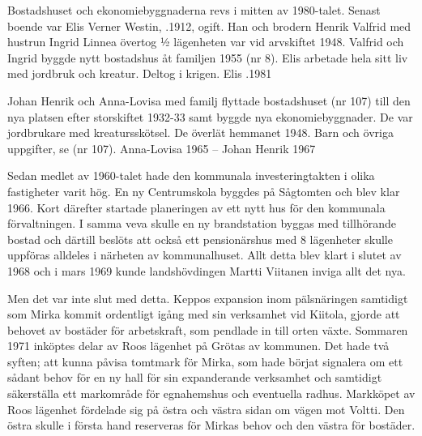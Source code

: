 
Bostadshuset och ekonomiebyggnaderna revs i mitten av 1980-talet. Senast boende var Elis Verner Westin, .1912, ogift. Han och brodern Henrik Valfrid med hustrun Ingrid Linnea övertog ½ lägenheten var vid arvskiftet 1948. Valfrid och Ingrid byggde nytt bostadshus åt familjen 1955 (nr 8). Elis arbetade hela sitt liv med jordbruk och kreatur.  Deltog i krigen. Elis .1981

Johan Henrik och Anna-Lovisa med familj flyttade  bostadshuset (nr 107) till den nya platsen efter storskiftet 1932-33 samt byggde nya ekonomiebyggnader. De var jordbrukare med kreatursskötsel. De överlät hemmanet 1948.
Barn och övriga uppgifter, se (nr 107).
Anna-Lovisa  1965  --  Johan Henrik  1967





Sedan medlet av 1960-talet hade den kommunala investeringtakten i olika fastigheter varit hög. En ny Centrumskola byggdes på Sågtomten och blev klar 1966. Kort därefter startade planeringen av ett nytt hus för den kommunala förvaltningen. I samma veva skulle en ny brandstation byggas med tillhörande bostad och därtill beslöts att också ett pensionärshus med 8 lägenheter skulle uppföras alldeles i närheten av kommunalhuset. Allt detta blev klart i slutet av 1968 och i mars 1969 kunde landshövdingen Martti Viitanen inviga allt det nya.

Men det var inte slut med detta. Keppos expansion inom pälsnäringen samtidigt som Mirka kommit ordentligt igång med sin verksamhet vid Kiitola, gjorde att behovet av bostäder för arbetskraft, som pendlade in till orten växte. Sommaren 1971 inköptes delar av Roos lägenhet på Grötas av kommunen. Det hade två syften; att kunna påvisa tomtmark för Mirka, som hade börjat signalera om ett sådant behov för en ny hall för sin expanderande verksamhet och samtidigt säkerställa ett markområde för egnahemshus och eventuella radhus. Markköpet av Roos lägenhet fördelade sig på östra och västra sidan om vägen mot Voltti. Den östra skulle i första hand reserveras för Mirkas behov och den västra för bostäder.

